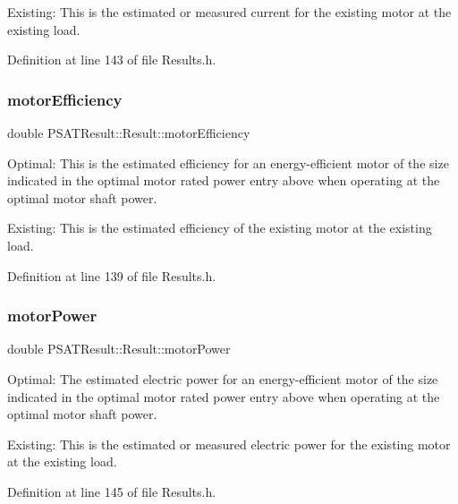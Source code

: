 Existing\+: This is the estimated or measured current for the existing motor at the existing load. 

Definition at line 143 of file Results.\+h.

\mbox{\label{struct_p_s_a_t_result_1_1_result_ad995bfd4c4d8372c99721d3fb43f1919}} 
\subsubsection{\texorpdfstring{motor\+Efficiency}{motorEfficiency}}
{\footnotesize\ttfamily double P\+S\+A\+T\+Result\+::\+Result\+::motor\+Efficiency}



Optimal\+: This is the estimated efficiency for an energy-\/efficient motor of the size indicated in the optimal motor rated power entry above when operating at the optimal motor shaft power. 

Existing\+: This is the estimated efficiency of the existing motor at the existing load. 

Definition at line 139 of file Results.\+h.

\mbox{\label{struct_p_s_a_t_result_1_1_result_ad51cbcc62a9515f5ffe119acbb4a4232}} 
\subsubsection{\texorpdfstring{motor\+Power}{motorPower}}
{\footnotesize\ttfamily double P\+S\+A\+T\+Result\+::\+Result\+::motor\+Power}



Optimal\+: The estimated electric power for an energy-\/efficient motor of the size indicated in the optimal motor rated power entry above when operating at the optimal motor shaft power. 

Existing\+: This is the estimated or measured electric power for the existing motor at the existing load. 

Definition at line 145 of file Results.\+h.

